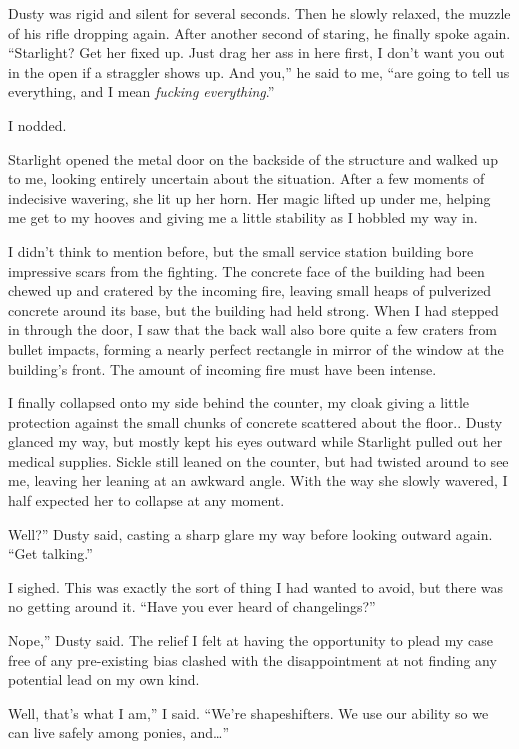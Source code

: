 Dusty was rigid and silent for several seconds. Then he slowly relaxed, the muzzle of his rifle dropping again. After another second of staring, he finally spoke again. “Starlight? Get her fixed up. Just drag her ass in here first, I don’t want you out in the open if a straggler shows up. And you,” he said to me, “are going to tell us everything, and I mean \textit{fucking everything}.”

I nodded.

Starlight opened the metal door on the backside of the structure and walked up to me, looking entirely uncertain about the situation. After a few moments of indecisive wavering, she lit up her horn. Her magic lifted up under me, helping me get to my hooves and giving me a little stability as I hobbled my way in.

I didn’t think to mention before, but the small service station building bore impressive scars from the fighting. The concrete face of the building had been chewed up and cratered by the incoming fire, leaving small heaps of pulverized concrete around its base, but the building had held strong. When I had stepped in through the door, I saw that the back wall also bore quite a few craters from bullet impacts, forming a nearly perfect rectangle in mirror of the window at the building’s front. The amount of incoming fire must have been intense.

I finally collapsed onto my side behind the counter, my cloak giving a little protection against the small chunks of concrete scattered about the floor.. Dusty glanced my way, but mostly kept his eyes outward while Starlight pulled out her medical supplies. Sickle still leaned on the counter, but had twisted around to see me, leaving her leaning at an awkward angle. With the way she slowly wavered, I half expected her to collapse at any moment.

\leavevmode{}Well?” Dusty said, casting a sharp glare my way before looking outward again. “Get talking.”

I sighed. This was exactly the sort of thing I had wanted to avoid, but there was no getting around it. “Have you ever heard of changelings?”

\leavevmode{}Nope,” Dusty said. The relief I felt at having the opportunity to plead my case free of any pre-existing bias clashed with the disappointment at not finding any potential lead on my own kind.

\leavevmode{}Well, that’s what I am,” I said. “We’re shapeshifters. We use our ability so we can live safely among ponies, and…”

